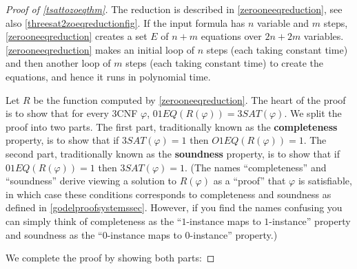 \begin{proof}[Proof of \cref{tsattozoeqthm}]
The reduction is described in \cref{zerooneeqreduction}, see also
\cref{threesat2zoeqreductionfig}. If the input formula has \(n\)
variable and \(m\) steps, \cref{zerooneeqreduction} creates a set \(E\)
of \(n+m\) equations over \(2n+2m\) variables. \cref{zerooneeqreduction}
makes an initial loop of \(n\) steps (each taking constant time) and
then another loop of \(m\) steps (each taking constant time) to create
the equations, and hence it runs in polynomial time.

Let \(R\) be the function computed by \cref{zerooneeqreduction}. The
heart of the proof is to show that for every 3CNF \(\varphi\),
\(01\ensuremath{\mathit{EQ}}(R(\varphi)) = 3\ensuremath{\mathit{SAT}}(\varphi)\).
We split the proof into two parts. The first part, traditionally known
as the \textbf{completeness} property, is to show that if
\(3\ensuremath{\mathit{SAT}}(\varphi)=1\) then
\(O1\ensuremath{\mathit{EQ}}(R(\varphi))=1\). The second part,
traditionally known as the \textbf{soundness} property, is to show that
if \(01\ensuremath{\mathit{EQ}}(R(\varphi))=1\) then
\(3\ensuremath{\mathit{SAT}}(\varphi)=1\). (The names ``completeness''
and ``soundness'' derive viewing a solution to \(R(\varphi)\) as a
``proof'' that \(\varphi\) is satisfiable, in which case these
conditions corresponds to completeness and soundness as defined in
\cref{godelproofsystemssec}. However, if you find the names confusing
you can simply think of completeness as the ``\(1\)-instance maps to
\(1\)-instance'' property and soundness as the ``\(0\)-instance maps to
\(0\)-instance'' property.)

We complete the proof by showing both parts:


\end{proof}

